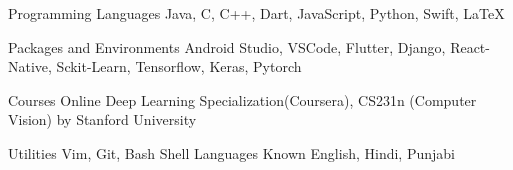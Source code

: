 \vspace{100mm}


\begin{cvskills}

  \cvskill
    {Programming Languages} %
    {Java, C, C++, Dart, JavaScript, Python, Swift, LaTeX} %

  \cvskill
    {Packages and Environments} %
    {Android Studio, VSCode, Flutter, Django, React-Native, Sckit-Learn, Tensorflow, Keras, Pytorch} %

  \cvskill
    {Courses Online} %
    {Deep Learning Specialization(Coursera), 
    CS231n (Computer Vision) by Stanford University} %

  \cvskill
    {Utilities} %
    {Vim, Git, Bash Shell} %
  \cvskill
    {Languages Known} %
    {English, Hindi, Punjabi} %

\end{cvskills}
